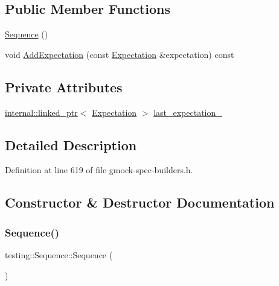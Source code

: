 \subsection*{Public Member Functions}
\begin{DoxyCompactItemize}
\item 
\hyperlink{classtesting_1_1Sequence_abde36441492d869e608175966f8f8c48}{Sequence} ()
\item 
void \hyperlink{classtesting_1_1Sequence_ac5b77b3b5b2e229ccbc13be1f3d17a9c}{Add\+Expectation} (const \hyperlink{classtesting_1_1Expectation}{Expectation} \&expectation) const
\end{DoxyCompactItemize}
\subsection*{Private Attributes}
\begin{DoxyCompactItemize}
\item 
\hyperlink{classtesting_1_1internal_1_1linked__ptr}{internal\+::linked\+\_\+ptr}$<$ \hyperlink{classtesting_1_1Expectation}{Expectation} $>$ \hyperlink{classtesting_1_1Sequence_a255551ecc8157f7f88cf6f58eb327419}{last\+\_\+expectation\+\_\+}
\end{DoxyCompactItemize}


\subsection{Detailed Description}


Definition at line 619 of file gmock-\/spec-\/builders.\+h.



\subsection{Constructor \& Destructor Documentation}
\mbox{\label{classtesting_1_1Sequence_abde36441492d869e608175966f8f8c48}} 
\subsubsection{\texorpdfstring{Sequence()}{Sequence()}}
{\footnotesize\ttfamily testing\+::\+Sequence\+::\+Sequence (\begin{DoxyParamCaption}{ }\end{DoxyParamCaption})\hspace{0.3cm}{\ttfamily [inline]}}



